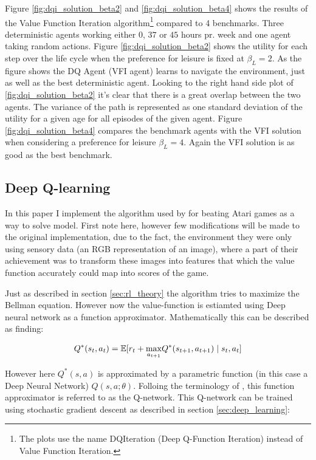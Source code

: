 Figure \ref{fig:dqi_solution_beta2} and \ref{fig:dqi_solution_beta4} shows the results of the Value Function Iteration algorithm\footnote{The plots use the name DQIteration (Deep Q-Function Iteration) instead of Value Function Iteration.} compared to 4 benchmarks. Three deterministic agents working either $0$, $37$ or $45$ hours pr. week and one agent taking random actions. Figure \ref{fig:dqi_solution_beta2} shows the utility for each step over the life cycle when the preference for leisure is fixed at $\beta_L = 2$. As the figure shows the DQ Agent (VFI agent) learns to navigate the environment, just as well as the best deterministic agent. Looking to the right hand side plot of \ref{fig:dqi_solution_beta2} it's clear that there is a great overlap between the two agents. The variance of the path is represented as one standard deviation of the utility for a given age for all episodes of the given agent. Figure \ref{fig:dqi_solution_beta4} compares the benchmark agents with the VFI solution when considering a preference for leisure $\beta_L = 4$. Again the VFI solution is as good as the best benchmark.

\newpage

\subsection{Deep Q-learning}

In this paper I implement the algorithm used by \parencite{mnih_playing_nodate} for beating Atari games as a way to solve model. First note here, however few modifications will be made to the original implementation, due to the fact, the environment they were only using sensory data (an RGB representation of an image), where a part of their achievement was to transform these images into features that which the value function accurately could map into scores of the game. 

Just as described in section \ref{sec:rl_theory} the algorithm tries to maximize the Bellman equation. However now the value-function is estiamted using Deep neural network as a function approximator. Mathematically this can be described as finding:

\begin{equation}
    Q^*(s_t,a_t) = \mathbb{E} [r_t + \underset{a_{t+1}}{\max}  Q^*(s_{t+1}, a_{t+1}) \mid s_t, a_t]
\end{equation}

However here $Q^*(s, a)$ is approximated by a parametric function (in this case a Deep Neural Network) $Q(s, a ; \theta)$. Folloing the terminology of \parencite{mnih_playing_nodate}, this function approximator is referred to as the Q-network. This Q-network can be trained using stochastic gradient descent as described in section \ref{sec:deep_learning}:

